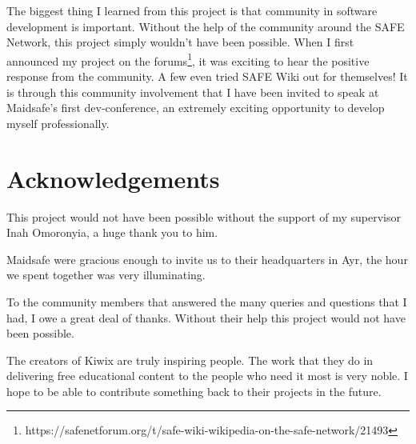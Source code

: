 The biggest thing I learned from this project is that community in software development is important. Without the help of the community around the SAFE Network, this project simply wouldn't have been possible. When I first announced my project on the forums\footnote{https://safenetforum.org/t/safe-wiki-wikipedia-on-the-safe-network/21493}, it was exciting to hear the positive response from the community. A few even tried SAFE Wiki out for themselves! It is through this community involvement that I have been invited to speak at Maidsafe's first dev-conference, an extremely exciting opportunity to develop myself professionally.

\section{Acknowledgements}

This project would not have been possible without the support of my supervisor Inah Omoronyia, a huge thank you to him.

Maidsafe were gracious enough to invite us to their headquarters in Ayr, the hour we spent together was very illuminating.

To the community members that answered the many queries and questions that I had, I owe a great deal of thanks. Without their help this project would not have been possible.

The creators of Kiwix are truly inspiring people. The work that they do in delivering free educational content to the people who need it most is very noble. I hope to be able to contribute something back to their projects in the future.